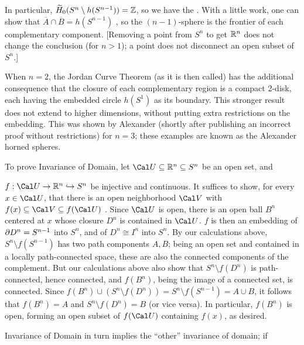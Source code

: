 \ssk

In particular, $\widetilde{H}_0(S^n\setminus h(S^{n-1}))={\Bbb Z}$, so 
we have the  . With a little work, one can show that
$\overline{A}\cap \overline{B} = h(S^{n-1})$ , so the $(n-1)$-sphere is the frontier of each
complementary component. [Removing a point from $S^n$ to get ${\Bbb R}^n$ does not change the
conclusion (for $n>1$); a point does not disconnect an open subset of $S^n$.]

\msk

When $n=2$, the Jordan Curve Theorem (as it is then called) has the additional
consequence that the closure of each complementary region is a compact 2-disk,
each having the embedded circle $h(S^1)$ as its boundary. This stronger result
does not extend to higher dimensions, without putting extra restrictions 
on the embedding. This was shown by Alexander (shortly after publishing an
incorrect proof without restrictions) for $n=3$; these examples are known as
the Alexander horned spheres.

\msk

To prove Invariance of Domain, let ${\Cal U}\subseteq \bbr^n\subseteq S^n$ be an open 
set, and 

$f:{\Cal U}\ra \bbr^n \hookrightarrow S^n$ be injective and continuous. It suffices
to show, for every $x\in {\Cal U}$, that there is an open neighborhood ${\Cal V}$ with
$f(x)\subseteq {\Cal V} \subseteq f({\Cal U})$ . Since ${\Cal U}$ is open,
there is an open ball $B^n$ centered at $x$ whose closure $D^n$ is contained in ${\Cal U}$. 
$f$ is then an embedding of $\partial D^n = S^{n-1}$ into $S^n$, and of $D^n\cong I^n$ into $S^n$.
By our calculations above, $S^n\setminus f(S^{n-1})$ has two path components $A,B$; being an open set 
and contained in a locally path-connected space, these are also the connected components
of the complement. But our calculations above also show that $S^n\setminus f(D^n)$ is
path-connected, hence connected, and $f(B^n)$, being the image of a connected set, is connected.
Since $f(B^n)\cup (S^n\setminus f(D^n)) = S^n\setminus f(S^{n-1}) = A\cup B$, it follows that
$f(B^n)=A$ and $S^n\setminus f(D^n) = B$ (or vice versa). In particular,
$f(B^n)$ is open, forming an open subset of $f({\Cal U})$ containing $f(x)$, as desired.

\bsk

Invariance of Domain in turn implies the ``other'' invariance of domain; if 

